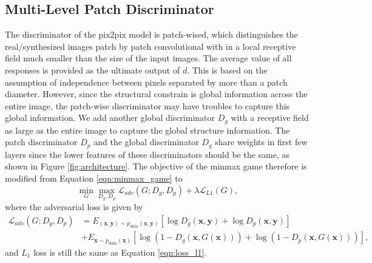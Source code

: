 \subsection{Multi-Level Patch Discriminator}
\label{subsec:disciminator}
The discriminator of the pix2pix model is patch-wised, which distinguishes the real/synthesized images patch by patch convolutional with in a local receptive field much smaller than the size of the input images. 
The average value of all responses is provided as the ultimate output of $d$. 
This is based on the assumption of independence between pixels separated by more than a patch diameter. 
However, since the structural constrain is global information across the entire image, the patch-wise discriminator may have troubles to capture this global information.
We add another global discriminator $D_g$ with a receptive field as large as the entire image to capture the global structure information. The patch discriminator $D_p$ and the global discriminator $D_g$ share weights in first few layers since the lower features of these discriminators should be the same, as shown in Figure \ref{fig:architecture}. The objective of the minmax game therefore is modified from Equation \ref{eqn:minmax_game} to
\begin{equation}
\label{eqn:new_minmax_game}
\min_G \max_{D_g, D_p} \mathcal{L}_{adv}(G;D_g,D_p)+\lambda \mathcal{L}_{L1}(G),
\end{equation}
where the adversarial loss is given by 
\begin{equation}
\label{eqn:new_loss_adv}
	\begin{aligned}
	\mathcal{L}_{adv}(G;D_g,D_p)&=E_{(\bm{x},\bm{y})\sim p_{data}(\bm{x},\bm{y})}[\log D_g(\bm{x},\bm{y})+\log D_p(\bm{x},\bm{y})] \\
	&+E_{\bm{x}\sim p_{data}(\bm{x})}[\log(1-D_g(\bm{x},G(\bm{x})))+\log(1-D_p(\bm{x},G(\bm{x})))],
	\end{aligned}
\end{equation}
and $L_1$ loss is still the same as Equation \ref{eqn:loss_l1}.
%
%
